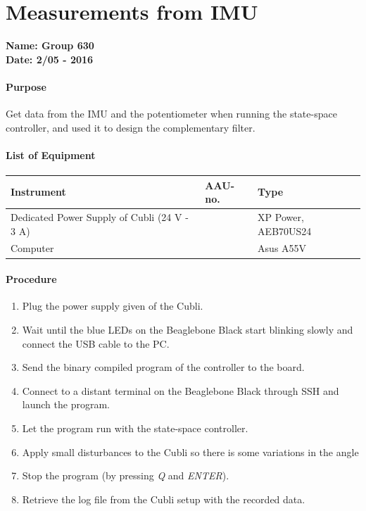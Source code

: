 \chapter{Measurements from IMU}\label{app:IMUMeasurementsAppendix}
\textbf{Name: Group 630}\\
\textbf{Date: 2/05 - 2016}

\subsubsection{Purpose}
Get data from the IMU and the potentiometer when running the state-space controller, and used it to design the complementary filter.             

\subsubsection{List of Equipment}
\begin{table}[H]
	\begin{tabular}{|l|l|p{4.3cm}|}
		\hline%
		\textbf{Instrument}                        &  \textbf{AAU-no.}  &  \textbf{Type}       \\
		\hline%
		Dedicated Power Supply of Cubli \small{(24 V - 3 A)} &               &  XP Power, AEB70US24 \\
		\hline%
		Computer                &              &  Asus A55V          \\
		\hline%
	\end{tabular}
\end{table}
\subsubsection{Procedure}
\begin{enumerate}
	  \item Plug the power supply given of the Cubli.
	  \item Wait until the blue LEDs on the Beaglebone Black start blinking slowly and connect the USB cable to the PC.
	  \item Send the binary compiled program of the controller to the board.
	  \item Connect to a distant terminal on the Beaglebone Black through SSH and launch the program.
	  \item Let the program run with the state-space controller.
	  \item Apply small disturbances to the Cubli so there is some variations in the angle
	  \item Stop the program (by pressing \textit{Q} and \textit{ENTER}).
	  \item Retrieve the log file from the Cubli setup with the recorded data.
\end{enumerate}

